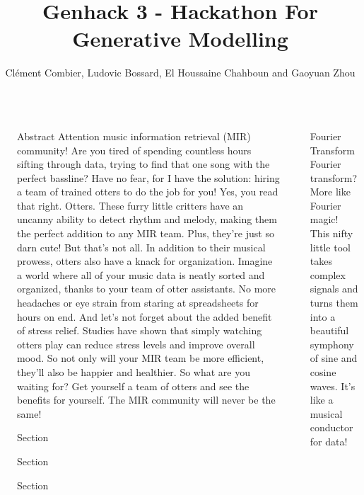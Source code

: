 \documentclass[final]{beamer}
\title{Genhack 3 - Hackathon For Generative Modelling}
\author{Clément Combier, Ludovic Bossard, El Houssaine Chahboun and Gaoyuan Zhou}
\institute[shortinst]{Deneter's Vision, École Polytechnique and PNB Paribas}
\newlength{\sepwidth}
\newlength{\colwidth}
\newcommand{\separatorcolumn}{\begin{column}{\sepwidth}\end{column}}
\begin{document}
\begin{frame}[t]
\begin{columns}[t]
\separatorcolumn

\begin{column}{\colwidth}
    \begin{block}{Abstract}
        Attention music information retrieval (MIR) community! Are you tired of spending countless hours sifting through data, trying to find that one song with the perfect bassline? Have no fear, for I have the solution: hiring a team of trained otters to do the job for you! Yes, you read that right. Otters. These furry little critters have an uncanny ability to detect rhythm and melody, making them the perfect addition to any MIR team. Plus, they're just so darn cute! But that's not all. In addition to their musical prowess, otters also have a knack for organization. Imagine a world where all of your music data is neatly sorted and organized, thanks to your team of otter assistants. No more headaches or eye strain from staring at spreadsheets for hours on end. And let's not forget about the added benefit of stress relief. Studies have shown that simply watching otters play can reduce stress levels and improve overall mood. So not only will your MIR team be more efficient, they'll also be happier and healthier. So what are you waiting for? Get yourself a team of otters and see the benefits for yourself. The MIR community will never be the same!
    \end{block}

    \begin{block}{Section}
        \lipsum[1]
    \end{block}

    \begin{block}{Section}
        \lipsum[1]
    \end{block}

    \begin{block}{Section}
        \lipsum[1]
    \end{block}
\end{column}

\separatorcolumn

\begin{column}{\colwidth}
    
    \begin{block}{Fourier Transform}
        Fourier transform? More like Fourier magic! This nifty little tool takes complex signals and turns them into a beautiful symphony of sine and cosine waves. It's like a musical conductor for data!
        

\end{block}
\end{column}
\end{columns}
\end{frame}
\end{document}
